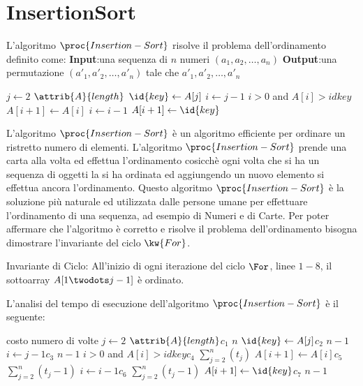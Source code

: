 \section{InsertionSort}
L'algoritmo $\proc{Insertion-Sort}$ risolve il problema dell'ordinamento definito come:
\textbf{Input}:una sequenza di $n$ numeri $(a_1,a_2,\dots,a_n)$ \newline
\textbf{Output}:una permutazione $(a'_1,a'_2,\dots,a'_n)$ tale che $a'_1,a'_2,\dots,a'_n$

\begin{codebox}
\li \For $j \gets 2$ \To $\attrib{A}{length}$
    \Do
\li            $\id{key} \gets A[j]$
\li         $i \gets j-1$
\li         \While $i > 0$ and $A[i] > id{key}$
            \Do
\li                $A[i+1] \gets A[i]$
\li                $i \gets i-1$
            \End
\li         $A[i+1] \gets \id{key}$
    \End
\end{codebox}

L'algoritmo $\proc{Insertion-Sort}$ è un algoritmo efficiente per ordinare un ristretto
numero di elementi.\newline
L'algoritmo $\proc{Insertion-Sort}$ prende una carta alla volta ed effettua l'ordinamento
cosicchè ogni volta che si ha un sequenza di oggetti la si ha ordinata ed aggiungendo
un nuovo elemento si effettua ancora l'ordinamento.\newline
Questo algoritmo $\proc{Insertion-Sort}$ è la soluzione più naturale ed utilizzata
dalle persone umane per effettuare l'ordinamento di una sequenza, ad esempio di Numeri e di Carte.
Per poter affermare che l'algoritmo è corretto e risolve il problema dell'ordinamento
bisogna dimostrare l'invariante del ciclo $\kw{For}$.

Invariante di Ciclo: All'inizio di ogni iterazione del ciclo $\For$, linee $1-8$,
il sottoarray $A[1\twodots j-1]$ è ordinato.


L'analisi del tempo di esecuzione dell'algoritmo $\proc{Insertion-Sort}$ è il seguente:
\begin{codebox}
     \>\>\> costo \quad numero di volte
\li \For $j \gets 2$ \To $\attrib{A}{length}$\>\>\>$c_1$ \quad $n$
    \Do
\li            $\id{key} \gets A[j]$\>\>$c_2$ \quad $n-1$
\li            $i \gets j-1$\>\>\>$c_3$ \quad $n-1$
\li         \While $i > 0$ and $A[i] > id{key}$\>\>$c_4$ $\sum_{j=2}^n (t_j)$
            \Do
\li                $A[i+1] \gets A[i]$\>\>$c_5$ $\sum_{j=2}^n (t_j -1)$
\li                $i \gets i-1$\>\>$c_6$ $\sum_{j=2}^n (t_j -1)$
            \End
\li         $A[i+1] \gets \id{key}$\>\>\>$c_7$ \quad $n-1$
    \End
\end{codebox}

